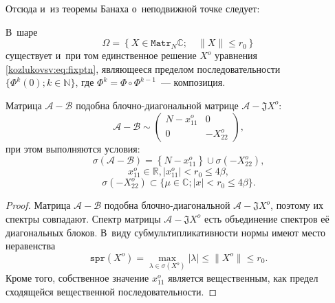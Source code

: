 Отсюда и~из теоремы Банаха о~неподвижной точке следует:
\begin{lem}
В~шаре \[ \Omega = \left\{ X\in\mathtt{Matr}_N\mathbb{C}; \quad \|X\| \leq r_0 \right\} \]
    существует и~при том единственное решение \( X^o \) уравнения \eqref{kozlukovsv:eq:fixptn},
    являющееся пределом последовательности \( \{ \Phi^k(0); k\in\mathbb{N} \} \),
    где \( \Phi^k = \Phi\circ\Phi^{k-1} \)~--- композиция.
\end{lem}

\begin{crl}
Матрица \( \mathcal{A} - \mathcal{B} \) подобна блочно-диагональной матрице \( \mathcal{A} - \mathfrak{J} X^o \):
\[ \mathcal{A} - \mathcal{B} \sim
\begin{pmatrix}
N - x_{11}^o & 0 \\
0 & -X_{22}^o
\end{pmatrix}, \]
при этом выполняются условия:
\[ \sigma\left(\mathcal{A} - \mathcal{B}\right) = \left\{N-x_{11}^o\right\}\cup \sigma\left(-X_{22}^o\right), \]
    \[ x_{11}^o\in\mathbb{R}, \lvert x_{11}^o \rvert < r_0 \leq 4\beta, \]
\[ \sigma\left(-X_{22}^o\right) \subset \{ \mu\in\mathbb{C}; \lvert x \rvert < r_0 \leq 4\beta \}. \]
\end{crl}
\begin{proof}
    Матрица \( \mathcal{A} - \mathcal{B} \) подобна блочно-диагональной \( \mathcal{A} - \mathfrak{J} X^o \),
    поэтому их спектры совпадают.
    Спектр матрицы \( \mathcal{A} - \mathfrak{J} X^o \) есть объединение спектров е\"е диагональных блоков.
    В~виду субмультипликативности нормы имеют место неравенства
    \[ \mathtt{spr}(X^o) = \max_{\lambda\in\sigma(X^o)}\lvert\lambda\rvert \leq \|X^o\| \leq r_0. \]
    Кроме того, собственное значение \( x_{11}^o \) является вещественным, как предел сходящейся вещественной последовательности.
\end{proof}
